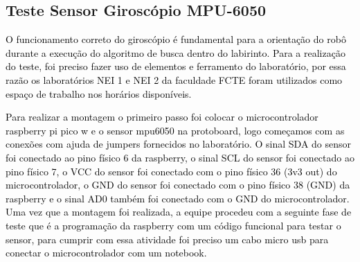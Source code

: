 
\subsection{Teste Sensor Giroscópio MPU-6050}

\textcolor{black}{O funcionamento correto do giroscópio é fundamental para a orientação do robô durante a execução do algoritmo de busca dentro do labirinto. Para a realização do teste, foi preciso fazer uso de elementos e ferramento do laboratório, por essa razão os laboratórios NEI 1 e NEI 2 da faculdade FCTE foram utilizados como espaço de trabalho nos horários disponíveis.}

\textcolor{black}{Para realizar a montagem o primeiro passo foi colocar o microcontrolador raspberry pi pico w e o sensor mpu6050 na protoboard, logo começamos com as conexões com ajuda de jumpers fornecidos no laboratório. O sinal SDA do sensor foi conectado ao pino físico 6 da raspberry, o sinal SCL do sensor foi conectado ao pino físico 7, o VCC do sensor foi conectado com o pino físico 36 (3v3 out) do microcontrolador, o GND do sensor foi conectado com o pino físico 38 (GND) da raspberry e o sinal AD0 também foi conectado com o GND do microcontrolador. Uma vez que a montagem foi realizada, a equipe procedeu com a seguinte fase de teste que é a programação da raspberry com um código funcional para testar o sensor, para cumprir com essa atividade foi preciso um cabo micro usb para conectar o microcontrolador com um notebook.}

